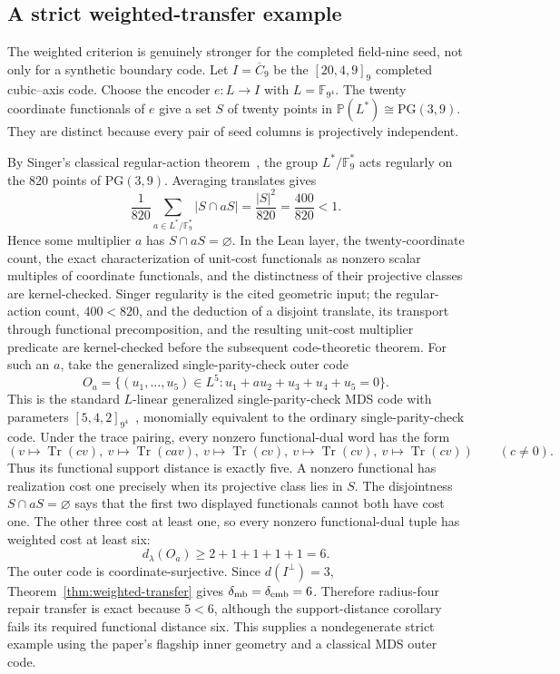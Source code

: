 \documentclass[11pt]{article}
\theoremstyle{definition}
\theoremstyle{remark}
\newcommand{\F}{\mathbb{F}}
\newcommand{\Tr}{\operatorname{Tr}}
\begin{document}
\subsection{A strict weighted-transfer example}

The weighted criterion is genuinely stronger for the completed field-nine
seed, not only for a synthetic boundary code.  Let $I=\overline C_9$ be the
$[20,4,9]_9$ completed cubic--axis code.  Choose the encoder
$e:L\to I$ with $L=\F_{9^4}$.  The twenty coordinate functionals of $e$
give a set $S$ of twenty points in $\mathbb P(L^*)\cong\mathrm{PG}(3,9)$.  They are
distinct because every pair of seed columns is projectively independent.

By Singer's classical regular-action theorem~\cite{Singer1938}, the group
$L^*/\F_9^*$ acts regularly on the 820 points of $\mathrm{PG}(3,9)$.
Averaging translates gives
\[
 \frac1{820}\sum_{a\in L^*/\F_9^*}|S\cap aS|
 =\frac{|S|^2}{820}=\frac{400}{820}<1.
\]
Hence some multiplier $a$ has $S\cap aS=\varnothing$.  In the Lean layer,
the twenty-coordinate count, the exact characterization of unit-cost
functionals as nonzero scalar multiples of coordinate functionals, and the
distinctness of their projective classes are kernel-checked.  Singer regularity
is the cited geometric input; the regular-action count, $400<820$, and the
deduction of a disjoint translate, its transport through functional
precomposition, and the resulting unit-cost multiplier predicate are
kernel-checked before the subsequent code-theoretic theorem.  For such an $a$,
take the generalized single-parity-check outer code
\[
 O_a=\{(u_1,\ldots,u_5)\in L^5:
       u_1+a u_2+u_3+u_4+u_5=0\}.
\]
This is the standard $L$-linear generalized single-parity-check MDS code
with parameters $[5,4,2]_{9^4}$~\cite{MacWilliamsSloane1977}, monomially
equivalent to the ordinary single-parity-check code.  Under the trace
pairing, every nonzero functional-dual word has the form
\[
 (v\mapsto\Tr(cv),\ v\mapsto\Tr(cav),\
  v\mapsto\Tr(cv),\ v\mapsto\Tr(cv),\ v\mapsto\Tr(cv))
 \qquad(c\ne0).
\]
Thus its functional support distance is exactly five.  A nonzero functional
has realization cost one precisely when its projective class lies in $S$.
The disjointness $S\cap aS=\varnothing$ says that the first two displayed
functionals cannot both have cost one.  The other three cost at least one,
so every nonzero functional-dual tuple has weighted cost at least six:
\[
 d_\lambda(O_a)\geq2+1+1+1+1=6.
\]
The outer code is coordinate-surjective.  Since $d(I^\perp)=3$,
Theorem~\ref{thm:weighted-transfer} gives
$\delta_{\rm mb}=\delta_{\rm emb}=6$.  Therefore radius-four repair transfer
is exact because $5<6$, although the support-distance corollary fails its required
functional distance six.  This supplies a nondegenerate strict example
using the paper's flagship inner geometry and a classical MDS outer code.
\end{document}

